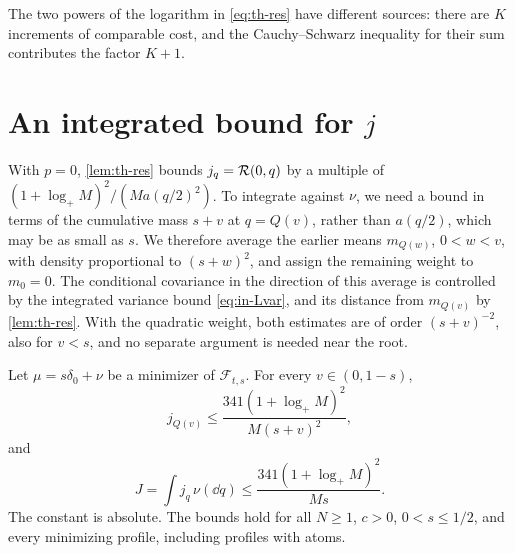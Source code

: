 The two powers of the logarithm in \eqref{eq:th-res} have different
sources: there are $K$ increments of comparable cost, and the
Cauchy--Schwarz inequality for their sum contributes the factor $K+1$.

\section{An integrated bound for \texorpdfstring{$j$}{j}}\label{sec:th-integrated}

With $p=0$, \cref{lem:th-res} bounds $j_q=\mathcal R(0,q)$ by a multiple of
$(1+\log_+M)^2/(Ma(q/2)^2)$. To integrate against $\nu$, we need a bound
in terms of the cumulative mass $s+v$ at $q=Q(v)$, rather than
$a(q/2)$, which may be as small as $s$. We therefore average the earlier
means $m_{Q(w)}$, $0<w<v$, with density proportional to $(s+w)^2$, and
assign the remaining weight to $m_0=0$. The conditional covariance in the direction of
this average is controlled by the integrated variance bound
\eqref{eq:in-Lvar}, and its distance from $m_{Q(v)}$ by
\cref{lem:th-res}. With the quadratic weight, both estimates are of
order $(s+v)^{-2}$, also for $v<s$, and no separate argument is needed
near the root.

\begin{proposition}\label{prop:th-j}
Let $\mu=s\delta_0+\nu$ be a minimizer of $\mathcal F_{t,s}$. For every
$v\in(0,1-s)$,
\begin{equation}\label{eq:th-j-pointwise}
 j_{Q(v)}\le\frac{341(1+\log_+M)^2}{M(s+v)^2},
\end{equation}
and
\begin{equation}\label{eq:th-J}
 J=\int j_q\,\nu(\dd q)\le\frac{341(1+\log_+M)^2}{Ms}.
\end{equation}
The constant is absolute. The bounds hold for all $N\ge1$, $c>0$,
$0<s\le1/2$, and every minimizing profile, including profiles with atoms.
\end{proposition}

